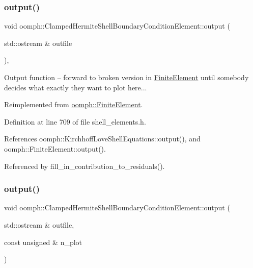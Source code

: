 \subsubsection{\texorpdfstring{output()}{output()}\hspace{0.1cm}{\footnotesize\ttfamily [1/4]}}
{\footnotesize\ttfamily void oomph\+::\+Clamped\+Hermite\+Shell\+Boundary\+Condition\+Element\+::output (\begin{DoxyParamCaption}\item[{std\+::ostream \&}]{outfile }\end{DoxyParamCaption})\hspace{0.3cm}{\ttfamily [inline]}, {\ttfamily [virtual]}}

Output function -- forward to broken version in \hyperlink{classoomph_1_1FiniteElement}{Finite\+Element} until somebody decides what exactly they want to plot here... 

Reimplemented from \hyperlink{classoomph_1_1FiniteElement_a2ad98a3d2ef4999f1bef62c0ff13f2a7}{oomph\+::\+Finite\+Element}.



Definition at line 709 of file shell\+\_\+elements.\+h.



References oomph\+::\+Kirchhoff\+Love\+Shell\+Equations\+::output(), and oomph\+::\+Finite\+Element\+::output().



Referenced by fill\+\_\+in\+\_\+contribution\+\_\+to\+\_\+residuals().

\mbox{\label{classoomph_1_1ClampedHermiteShellBoundaryConditionElement_a099a046661da996bac32617c0479b220}} 
\subsubsection{\texorpdfstring{output()}{output()}\hspace{0.1cm}{\footnotesize\ttfamily [2/4]}}
{\footnotesize\ttfamily void oomph\+::\+Clamped\+Hermite\+Shell\+Boundary\+Condition\+Element\+::output (\begin{DoxyParamCaption}\item[{std\+::ostream \&}]{outfile,  }\item[{const unsigned \&}]{n\+\_\+plot }\end{DoxyParamCaption})\hspace{0.3cm}{\ttfamily [virtual]}}



